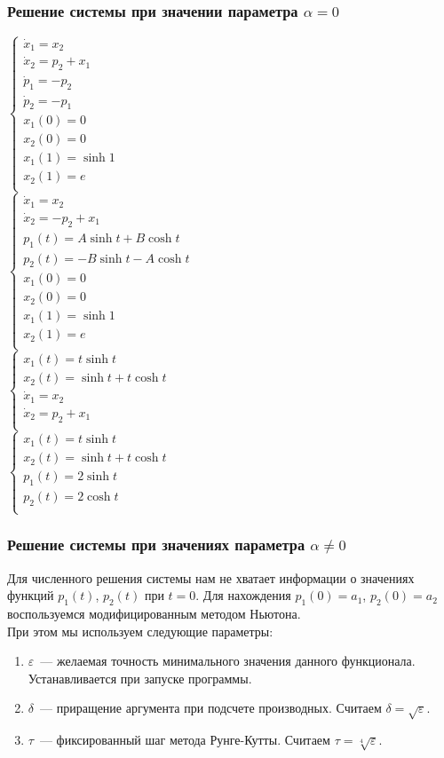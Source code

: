 \documentclass[24pt]{article}
\begin{document}
\subsubsection{Решение системы при значении параметра $\alpha = 0$}
$
\begin{cases}
\dot x_1 = x_2\\
\dot x_2 = p_2 + x_1\\
\dot p_1 = -p_2\\
\dot p_2 = -p_1\\
x_1(0) = 0\\
x_2(0) = 0\\
x_1(1) = \sinh 1\\
x_2(1) = e\\
\end{cases}
$\\
$
\begin{cases}
\dot x_1 = x_2\\
\dot x_2 = -p_2 + x_1\\
p_1(t) = A \sinh t + B \cosh t\\
p_2(t) = -B \sinh t - A \cosh t\\
x_1(0) = 0\\
x_2(0) = 0\\
x_1(1) = \sinh 1\\
x_2(1) = e\\
\end{cases}
$
\\
$
\begin{cases}
x_1(t) = t\sinh t\\
x_2(t) = \sinh t + t\cosh t\\
\dot x_1 = x_2\\
\dot x_2 = p_2 + x_1\\
\end{cases}
$
\\
$
\begin{cases}
x_1(t) = t\sinh t\\
x_2(t) = \sinh t + t\cosh t\\
p_1(t) = 2 \sinh t\\
p_2(t) = 2 \cosh t\\
\end{cases}
$
\subsubsection{Решение системы при значениях параметра $\alpha \neq 0$}
Для численного решения системы нам не хватает информации о значениях функций $p_1(t)$, $p_2(t)$ при $t = 0$.
Для нахождения $p_1 (0) = a_1$, $p_2(0) = a_2$ воспользуемся модифицированным методом Ньютона.\\
При этом мы используем следующие параметры:
\begin{enumerate}
\item
$\varepsilon$~--- желаемая точность минимального значения данного функционала. Устанавливается при запуске программы.
\item
$\delta$~--- приращение аргумента при подсчете производных. Считаем $\delta = \sqrt{\varepsilon}$.
\item
$\tau$~--- фиксированный шаг метода Рунге-Кутты. Считаем $\tau = \sqrt[4]{\varepsilon}$.
\end{enumerate}
\end{document}
